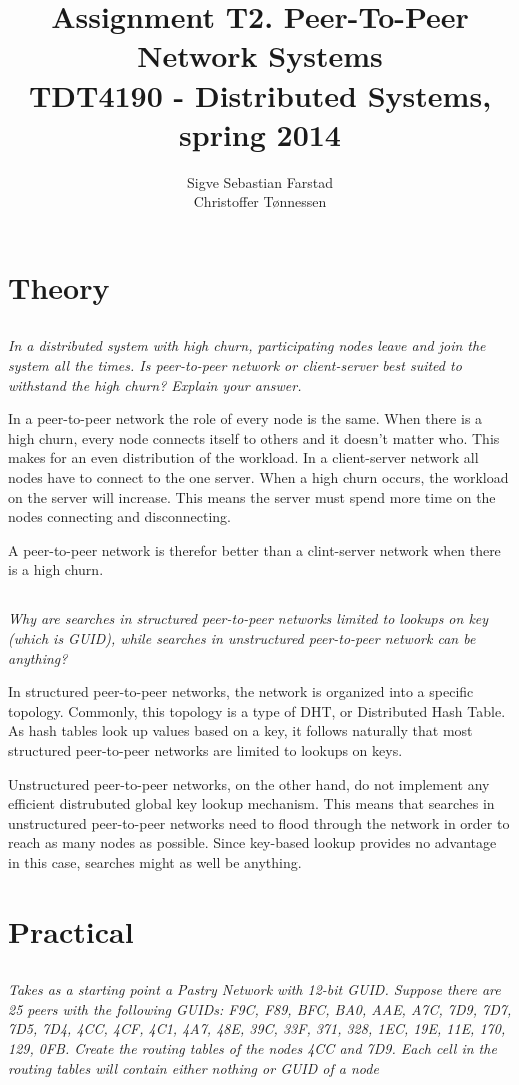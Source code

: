 \documentclass{article}
\title{Assignment T2. Peer-To-Peer Network Systems \\
\large TDT4190 - Distributed Systems, spring 2014}
\author{
    Sigve Sebastian Farstad \\
    Christoffer Tønnessen
}
\newcommand{\question}[1]{\subsection{}\textit{#1}\bigskip}
\begin{document}
\maketitle

\section{Theory}

\question{In a distributed system with high churn, participating nodes leave and join the system all the times. Is peer-to-peer network or client-server best suited to withstand the high churn? Explain your answer.}

In a peer-to-peer network the role of every node is the same.
When there is a high churn, every node connects itself to others and it doesn't matter who.
This makes for an even distribution of the workload.
In a client-server network all nodes have to connect to the one server.
When a high churn occurs, the workload on the server will increase.
This means the server must spend more time on the nodes connecting and disconnecting.

A peer-to-peer network is therefor better than a clint-server network when there is a high churn.

\question{Why are searches in structured peer-to-peer networks limited to lookups on key (which is GUID), while searches in unstructured peer-to-peer network can be anything?}

In structured peer-to-peer networks, the network is organized into a specific topology.
Commonly, this topology is a type of DHT, or Distributed Hash Table.
As hash tables look up values based on a key, it follows naturally that most structured peer-to-peer networks are limited to lookups on keys.

Unstructured peer-to-peer networks, on the other hand, do not implement any efficient distrubuted global key lookup mechanism.
This means that searches in unstructured peer-to-peer networks need to flood through the network in order to reach as many nodes as possible.
Since key-based lookup provides no advantage in this case, searches might as well be anything.

 \section{Practical}

 \question{Takes as a starting point a Pastry Network with 12-bit GUID. Suppose there are 25 peers with the following GUIDs: F9C, F89, BFC, BA0, AAE, A7C, 7D9, 7D7, 7D5, 7D4, 4CC, 4CF, 4C1, 4A7, 48E, 39C, 33F, 371, 328, 1EC, 19E, 11E, 170, 129, 0FB. Create the routing tables of the nodes 4CC and 7D9. Each cell in the routing tables will contain either nothing or GUID of a node}
\end{document}
